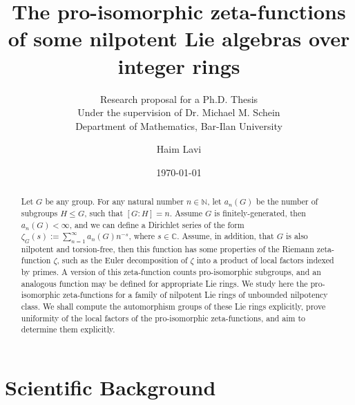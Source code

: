 \documentclass[12pt]{article}
\title{The pro-isomorphic zeta-functions of some nilpotent Lie algebras over integer rings}
\subtitle{Research proposal for a Ph.D. Thesis\\
Under the supervision of Dr. Michael M. Schein\\
Department of Mathematics, Bar-Ilan University}
\author{Haim Lavi}
\date{\today}
\begin{document}
\maketitle
\newpage
\tableofcontents
\newpage
\begin{abstract}
Let $G$ be any group. For any natural number $n\in\mathbb{N}$, let $a_{n}(G)$ be the number of subgroups $H\leq G$, such that $[G:H]=n$. Assume $G$ is finitely-generated, then $a_{n}(G)<\infty$, and we can define a Dirichlet series of the form $\zeta_G(s):=\sum_{n=1}^\infty a_{n}(G){n}^{-s}$, where $s\in\mathbb{C}$. Assume, in addition, that $G$ is also nilpotent and torsion-free, then this function has some properties of the Riemann zeta-function $\zeta$, such as the Euler decomposition of $\zeta$ into a product of local factors indexed by primes. A version of this zeta-function counts pro-isomorphic subgroups, and an analogous function may be defined for appropriate Lie rings. We study here the pro-isomorphic zeta-functions for a family of nilpotent Lie rings of unbounded nilpotency class. We shall compute the automorphism groups of these Lie rings explicitly, prove uniformity of the local factors of the pro-isomorphic zeta-functions, and aim to determine them explicitly.
\end{abstract}
\section{Scientific Background}
\end{document}
